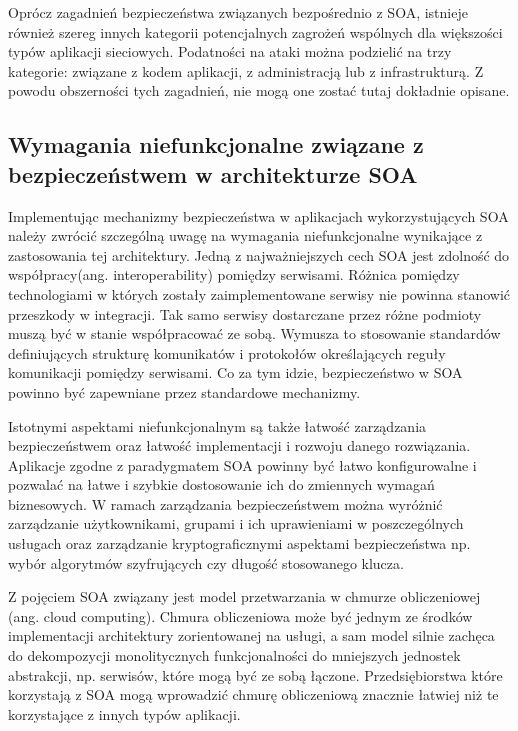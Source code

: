 		Oprócz zagadnień bezpieczeństwa związanych bezpośrednio z SOA, istnieje również szereg innych kategorii potencjalnych zagrożeń wspólnych dla większości typów aplikacji sieciowych. Podatności na ataki można podzielić na trzy kategorie: związane z kodem aplikacji, z administracją lub z infrastrukturą. Z powodu obszerności tych zagadnień, nie mogą one zostać tutaj dokładnie opisane.

	\subsection{Wymagania niefunkcjonalne związane z bezpieczeństwem w architekturze SOA}	
	
		Implementując mechanizmy bezpieczeństwa w aplikacjach wykorzystujących SOA należy zwrócić szczególną uwagę na wymagania niefunkcjonalne wynikające z zastosowania tej architektury. Jedną z najważniejszych cech SOA jest zdolność do współpracy(ang. interoperability) pomiędzy serwisami. Różnica pomiędzy technologiami w których zostały zaimplementowane serwisy nie powinna stanowić przeszkody w integracji. Tak samo serwisy dostarczane przez różne podmioty muszą być w stanie współpracować ze sobą. Wymusza to stosowanie standardów definiujących strukturę komunikatów i protokołów określających reguły komunikacji pomiędzy serwisami. Co za tym idzie, bezpieczeństwo w SOA powinno być zapewniane przez standardowe mechanizmy.
		
		Istotnymi aspektami niefunkcjonalnym są także łatwość zarządzania bezpieczeństwem oraz łatwość implementacji i rozwoju danego rozwiązania. Aplikacje zgodne z paradygmatem SOA powinny być łatwo konfigurowalne i pozwalać na łatwe i szybkie dostosowanie ich do zmiennych wymagań biznesowych. W ramach zarządzania bezpieczeństwem można wyróżnić zarządzanie użytkownikami, grupami i ich uprawieniami w poszczególnych usługach oraz zarządzanie kryptograficznymi aspektami bezpieczeństwa np. wybór algorytmów szyfrujących czy długość stosowanego klucza. 



\label{sec:cloudComputing}
	
	Z pojęciem SOA związany jest model przetwarzania w chmurze obliczeniowej (ang. cloud computing). Chmura obliczeniowa może być jednym ze środków implementacji architektury zorientowanej na usługi, a sam model silnie zachęca do dekompozycji monolitycznych funkcjonalności do mniejszych jednostek abstrakcji, np. serwisów, które mogą być ze sobą łączone. Przedsiębiorstwa które korzystają z SOA mogą wprowadzić chmurę obliczeniową znacznie łatwiej niż te korzystające z innych typów aplikacji.  
	

